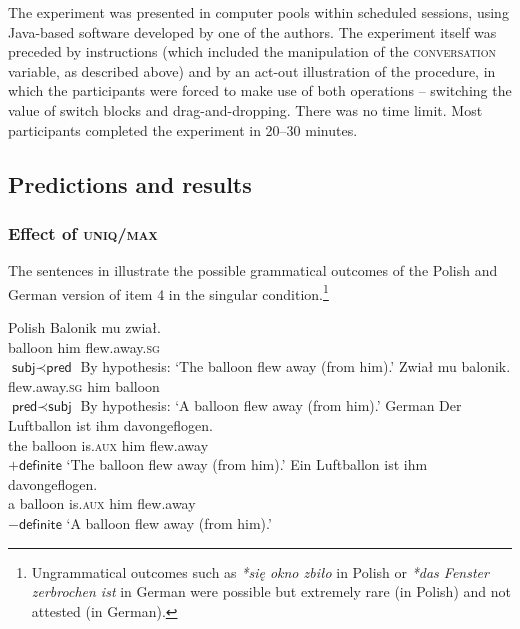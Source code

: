 \documentclass[output=paper]{langscibook}
\begin{document}
The experiment was presented in computer pools within scheduled sessions, using Java-based software developed by one of the authors. The experiment itself was preceded by instructions (which included the manipulation of the \textsc{conversation} variable, as described above) and by an act-out illustration of the procedure, in which the participants were forced to make use of both operations -- switching the value of switch blocks and drag-and-dropping. There was no time limit. Most participants completed the experiment in 20--30 minutes.

\subsection{Predictions and results}

\subsubsection{Effect of \textsc{uniq/max}}
\largerpage[-1] %

The sentences in  illustrate the possible grammatical outcomes of the Polish and German version of item 4 in the \textsf{singular} condition.\footnote{Ungrammatical outcomes such as \textit{*się okno zbiło} in Polish or \textit{*das Fenster zerbrochen ist} in German were possible but extremely rare (in Polish) and not attested (in German).}

\ea\label{sim-dem:ex:outcome}\ea Polish
\ea\gll Balonik mu zwiał.\\
balloon him flew.away.\textsc{sg}\\\hfill $\textsf{subj}\prec\textsf{pred}$
\glt By hypothesis: `The balloon flew away (from him).'
\ex\gll Zwiał mu balonik.\\
flew.away.\textsc{sg} him balloon\\\hfill $\textsf{pred}\prec\textsf{subj}$
\glt By hypothesis: `A balloon flew away (from him).'
\z
\ex German
\ea\gll Der Luftballon ist ihm davongeflogen.\\
the balloon is.\textsc{aux} him flew.away\\\hfill$+\textsf{definite}$
\glt `The balloon flew away (from him).'
\ex\gll Ein Luftballon ist ihm davongeflogen.\\
a balloon is.\textsc{aux} him flew.away\\\hfill$-\textsf{definite}$
\glt `A balloon flew away (from him).'
\z
\z\z
\end{document}
